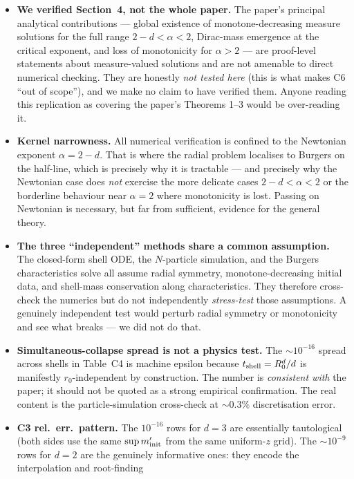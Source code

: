\documentclass[11pt]{article}
\begin{document}
\begin{itemize}
\item \textbf{We verified Section~4, not the whole paper.} The paper's
principal analytical contributions --- global existence of monotone-decreasing
measure solutions for the full range $2-d<\alpha<2$, Dirac-mass emergence at
the critical exponent, and loss of monotonicity for $\alpha>2$ --- are
proof-level statements about measure-valued solutions and are not amenable to
direct numerical checking. They are honestly \emph{not tested here} (this is
what makes C6 ``out of scope''), and we make no claim to have verified them.
Anyone reading this replication as covering the paper's Theorems 1--3 would
be over-reading it.
\item \textbf{Kernel narrowness.} All numerical verification is confined to the
Newtonian exponent $\alpha=2-d$. That is where the radial problem localises to
Burgers on the half-line, which is precisely why it is tractable --- and
precisely why the Newtonian case does \emph{not} exercise the more delicate
cases $2-d<\alpha<2$ or the borderline behaviour near $\alpha=2$ where
monotonicity is lost. Passing on Newtonian is necessary, but far from
sufficient, evidence for the general theory.
\item \textbf{The three ``independent'' methods share a common assumption.}
The closed-form shell ODE, the $N$-particle simulation, and the Burgers
characteristics solve all assume radial symmetry, monotone-decreasing initial
data, and shell-mass conservation along characteristics. They therefore
cross-check the numerics but do not independently \emph{stress-test} those
assumptions. A genuinely independent test would perturb radial symmetry or
monotonicity and see what breaks --- we did not do that.
\item \textbf{Simultaneous-collapse spread is not a physics test.} The
$\sim\!10^{-16}$ spread across shells in Table~C4 is machine epsilon
because $t_{\rm shell}=R_0^d/d$ is manifestly $r_0$-independent by
construction. The number is \emph{consistent with} the paper; it should not
be quoted as a strong empirical confirmation. The real content is the
particle-simulation cross-check at $\sim\!0.3\%$ discretisation error.
\item \textbf{C3 rel.\ err.\ pattern.} The $10^{-16}$ rows for $d=3$ are
essentially tautological (both sides use the same $\sup m'_{\rm init}$ from
the same uniform-$z$ grid). The $\sim\!10^{-9}$ rows for $d=2$ are the
genuinely informative ones: they encode the interpolation and root-finding

\end{itemize}
\end{document}
